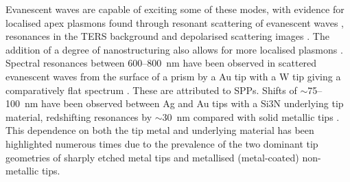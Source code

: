 \documentclass{article}
\begin{document}
Evanescent waves are capable of exciting some of these modes, with evidence for localised apex plasmons found through resonant scattering of evanescent waves \cite{neacsu2005, mehtani2006, barrios2009}, resonances in the TERS background \cite{pettinger2007, pettinger2009} and depolarised scattering images \cite{mino2014}. The addition of a degree of nanostructuring also allows for more localised plasmons \cite{hayazawa2001, bailo2008, hayazawa2012, mino2014}.
Spectral resonances between 600--\SI{800}{nm} have been observed in scattered evanescent waves from the surface of a prism by a Au tip with a W tip giving a comparatively flat spectrum \cite{neacsu2005}. These are attributed to SPPs. Shifts of $\sim$75--\SI{100}{nm} have been observed between Ag and Au tips with a Si\subs3N underlying tip material, redshifting resonances by $\sim$\SI{30}{nm} compared with solid metallic tips \cite{mehtani2006, barrios2009}. This dependence on both the tip metal and underlying material has been highlighted numerous times due to the prevalence of the two dominant tip geometries of sharply etched metal tips and metallised (metal-coated) non-metallic tips.
\end{document}
